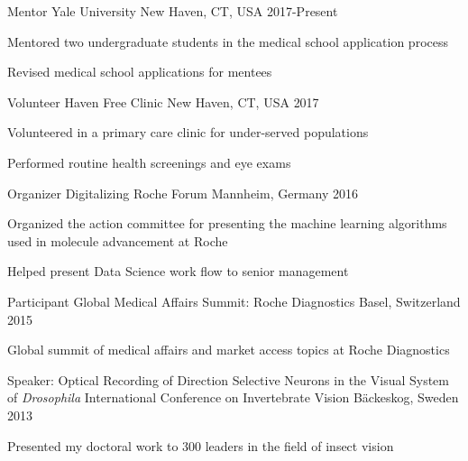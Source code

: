 \begin{cventries}
 

\cventry
{Mentor} %
{Yale University} %
{New Haven, CT, USA} %
{2017-Present} %
{ %
\begin{cvitems}
\item {Mentored two undergraduate students in the medical school application process}
\item {Revised medical school applications for mentees}
\end{cvitems} 
}

      
\cventry
{Volunteer} %
{Haven Free Clinic} %
{New Haven, CT, USA} %
{2017} %
{ %
\begin{cvitems}
\item {Volunteered in a primary care clinic for under-served populations}
\item {Performed routine health screenings and eye exams}
\end{cvitems} 
}


\cventry
{Organizer} %
{Digitalizing Roche Forum} %
{Mannheim, Germany} %
{2016} %
{ %
\begin{cvitems}
\item {Organized the action committee for presenting the machine learning algorithms used in molecule advancement at Roche}
\item {Helped present Data Science work flow to senior management}
\end{cvitems} 
}


\cventry
{Participant} %
{Global Medical Affairs Summit: Roche Diagnostics} %
{Basel, Switzerland} %
{2015} %
{ %
\begin{cvitems}
\item {Global summit of medical affairs and market access topics at Roche Diagnostics}
\end{cvitems} 
}

 \cventry
{Speaker: Optical Recording of Direction Selective Neurons in the Visual System of \textit{Drosophila}} %
{International Conference on Invertebrate Vision} %
{B{\"a}ckeskog, Sweden} %
{2013} %
{
\begin{cvitems} %
\item {Presented my doctoral work to 300 leaders in the field of insect vision}
\end{cvitems}
}


\end{cventries}
